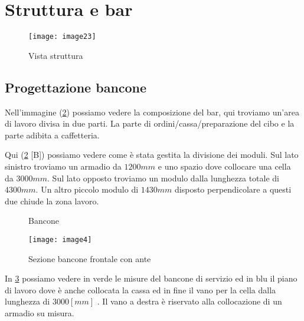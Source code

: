 \section{Struttura e bar}



\begin{figure}[H]
	\centering
	\texttt{[image: image23]}
\end{figure}
\begin{figure}[H]
	\captionsetup[subfloat]{}
	\hspace{0.8cm}
	\hspace{1cm}
	
	\caption{Vista struttura}
	\label{fig:compsizionebar}
\end{figure}


\subsection{Progettazione bancone}

Nell'immagine (\cref{fig:bancone}) possiamo vedere la composizione del bar, qui troviamo un'area di lavoro divisa in due parti. La parte di ordini/cassa/preparazione del cibo e la parte adibita a caffetteria.


Qui  (\cref{fig:bancone} [B]) possiamo vedere come è stata gestita la divisione dei moduli. Sul lato sinistro troviamo un armadio da $1200 mm$ e uno spazio dove collocare una cella da $3000 mm$. Sul lato opposto troviamo un modulo dalla lunghezza totale di $4300 mm$.  Un  altro piccolo modulo di $1430mm$ disposto perpendicolare a questi due chiude la zona lavoro.


\begin{figure}[H]
	\captionsetup[subfloat]{farskip=2pt,captionskip=8pt}
	\centering
	\hspace{1cm}
	
	\caption{Bancone}
	\label{fig:bancone}
\end{figure}

\begin{figure}[H]
	\centering
	\texttt{[image: image4]}
	\caption{Sezione bancone frontale con ante}
	\label{fig:banconeante}
\end{figure}

\noindent
In \cref{fig:banconeante} possiamo vedere in verde le misure del bancone di servizio ed in blu il piano di lavoro dove è anche collocata la  cassa  ed in fine il vano per la cella dalla lunghezza di $3000 [mm]$ .  Il vano a destra è riservato alla collocazione di un armadio su misura. 

